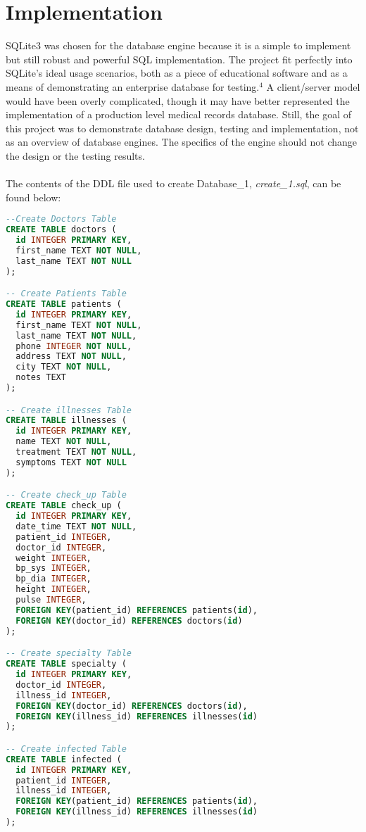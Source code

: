 \documentclass[12pt]{article}
\theoremstyle{plain}
\theoremstyle{definition}
\begin{document}
\section*{Implementation}
SQLite3 was chosen for the database engine because it is a simple to implement but still robust and powerful SQL implementation.  The project fit perfectly into SQLite's ideal usage scenarios, both as a piece of educational software and as a means of demonstrating an enterprise database for testing.$^{4}$  A client/server model would have been overly complicated, though it may have better represented the implementation of a production level medical records database.  Still, the goal of this project was to demonstrate database design, testing and implementation, not as an overview of database engines.  The specifics of the engine should not change the design or the testing results.
\\
\\
The contents of the DDL file used to create Database\_1, \textit{create\_1.sql}, can be found below:
\begin{lstlisting}[language =SQL]
--Create Doctors Table
CREATE TABLE doctors (
  id INTEGER PRIMARY KEY,
  first_name TEXT NOT NULL,
  last_name TEXT NOT NULL
);

-- Create Patients Table
CREATE TABLE patients (
  id INTEGER PRIMARY KEY,
  first_name TEXT NOT NULL,
  last_name TEXT NOT NULL,
  phone INTEGER NOT NULL,
  address TEXT NOT NULL,
  city TEXT NOT NULL,
  notes TEXT
);

-- Create illnesses Table
CREATE TABLE illnesses (
  id INTEGER PRIMARY KEY,
  name TEXT NOT NULL,
  treatment TEXT NOT NULL,
  symptoms TEXT NOT NULL
);

-- Create check_up Table
CREATE TABLE check_up (
  id INTEGER PRIMARY KEY,
  date_time TEXT NOT NULL,
  patient_id INTEGER,
  doctor_id INTEGER,
  weight INTEGER,
  bp_sys INTEGER,
  bp_dia INTEGER,
  height INTEGER,
  pulse INTEGER,
  FOREIGN KEY(patient_id) REFERENCES patients(id),
  FOREIGN KEY(doctor_id) REFERENCES doctors(id)
);

-- Create specialty Table
CREATE TABLE specialty (
  id INTEGER PRIMARY KEY,
  doctor_id INTEGER,
  illness_id INTEGER,
  FOREIGN KEY(doctor_id) REFERENCES doctors(id),
  FOREIGN KEY(illness_id) REFERENCES illnesses(id)
);

-- Create infected Table
CREATE TABLE infected (
  id INTEGER PRIMARY KEY,
  patient_id INTEGER,
  illness_id INTEGER,
  FOREIGN KEY(patient_id) REFERENCES patients(id),
  FOREIGN KEY(illness_id) REFERENCES illnesses(id)
);
\end{lstlisting}
\end{document}
